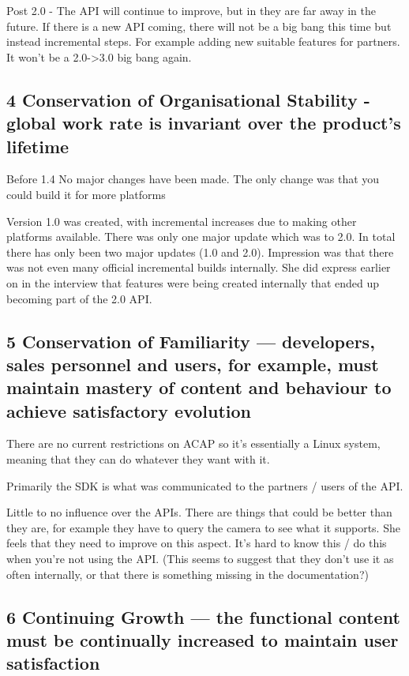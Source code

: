 \documentclass[conference]{IEEEtran}
\begin{document}
Post 2.0 - The API will continue to improve, but in they are far away in the future. If there is a new API coming, there will not be a big bang this time but instead incremental steps. For example adding new suitable features for partners. It won’t be a 2.0->3.0 big bang again. 

\subsection{4 Conservation of Organisational Stability - global work rate is invariant over the product's lifetime}
Before 1.4
No major changes have been made. 
The only change was that you could build it for more platforms

Version 1.0 was created, with incremental increases due to making other platforms available. There was only one major update which was to 2.0. In total there has only been two major updates (1.0 and 2.0).
Impression was that there was not even many official incremental builds internally. She did express earlier on in the interview that features were being created internally that ended up becoming part of the 2.0 API.


\subsection{5 Conservation of Familiarity — developers, sales personnel and users, for example, must maintain mastery of content and behaviour to achieve satisfactory evolution}
There are no current restrictions on ACAP so it’s essentially a Linux system, meaning that they can do whatever they want with it. 

Primarily the SDK is what was communicated to the partners / users of the API.

Little to no influence over the APIs. There are things that could be better than they are, for example they have to query the camera to see what it supports. She feels that they need to improve on this aspect. It’s hard to know this / do this when you’re not using the API. (This seems to suggest that they don’t use it as often internally, or that there is something missing in the documentation?)

\subsection{6 Continuing Growth — the functional content must be continually increased to maintain user satisfaction}
\end{document}
